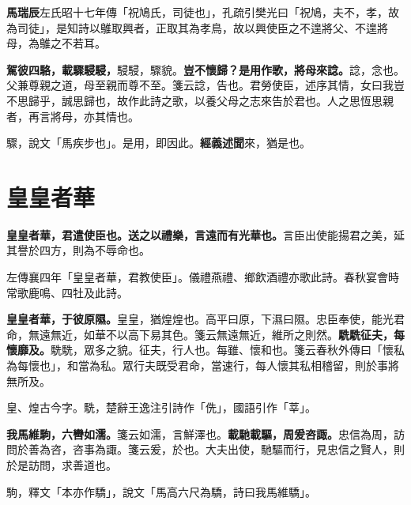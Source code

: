 \begin{quoting}\textbf{馬瑞辰}左氏昭十七年傳「祝鳩氏，司徒也」，孔疏引樊光曰「祝鳩，夫不，孝，故為司徒」，是知詩以鵻取興者，正取其為孝鳥，故以興使臣之不遑將父、不遑將母，為鵻之不若耳。\end{quoting}

\textbf{駕彼四駱，載驟駸駸，}{\footnotesize 駸駸，驟貌。}\textbf{豈不懷歸？是用作歌，將母來諗。}{\footnotesize 諗，念也。父兼尊親之道，母至親而尊不至。箋云諗，告也。君勞使臣，述序其情，女曰我豈不思歸乎，誠思歸也，故作此詩之歌，以養父母之志來告於君也。人之思恆思親者，再言將母，亦其情也。}

\begin{quoting}驟，說文「馬疾步也」。是用，即因此。\textbf{經義述聞}來，猶是也。\end{quoting}

\section{皇皇者華}


\textbf{皇皇者華，君遣使臣也。送之以禮樂，言遠而有光華也。}{\footnotesize 言臣出使能揚君之美，延其譽於四方，則為不辱命也。}

\begin{quoting}左傳襄四年「皇皇者華，君教使臣」。儀禮燕禮、鄉飲酒禮亦歌此詩。春秋宴會時常歌鹿鳴、四牡及此詩。\end{quoting}

\textbf{皇皇者華，于彼原隰。}{\footnotesize 皇皇，猶煌煌也。高平曰原，下濕曰隰。忠臣奉使，能光君命，無遠無近，如華不以高下易其色。箋云無遠無近，維所之則然。}\textbf{駪駪征夫，每懷靡及。}{\footnotesize 駪駪，眾多之貌。征夫，行人也。每雖、懷和也。箋云春秋外傳曰「懷私為每懷也」，和當為私。眾行夫既受君命，當速行，每人懷其私相稽留，則於事將無所及。}

\begin{quoting}皇、煌古今字。駪，楚辭王逸注引詩作「侁」，國語引作「莘」。\end{quoting}

\textbf{我馬維駒，六轡如濡。}{\footnotesize 箋云如濡，言鮮澤也。}\textbf{載馳載驅，周爰咨諏。}{\footnotesize 忠信為周，訪問於善為咨，咨事為諏。箋云爰，於也。大夫出使，馳驅而行，見忠信之賢人，則於是訪問，求善道也。}

\begin{quoting}駒，釋文「本亦作驕」，說文「馬高六尺為驕，詩曰我馬維驕」。\end{quoting}

